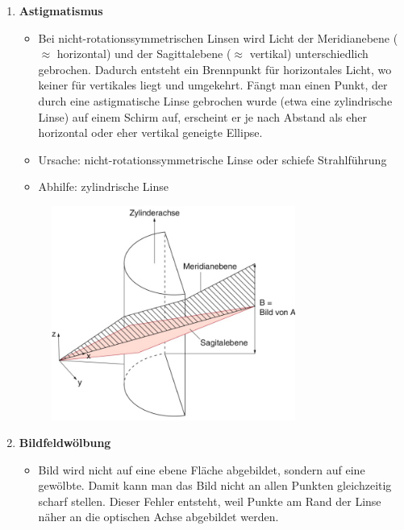 \documentclass[a4paper, 11pt, ngerman, parskip=half-]{scrartcl}
\begin{document}
\begin{enumerate}
    \item \textbf{Astigmatismus}
          \begin{itemize}
              \item Bei nicht-rotationssymmetrischen Linsen wird Licht der Meridianebene ($\approx$ horizontal) und der Sagittalebene ($\approx$ vertikal)
                    unterschiedlich gebrochen. Dadurch entsteht ein Brennpunkt für horizontales Licht, wo keiner für vertikales liegt und umgekehrt. Fängt man einen
                    Punkt, der durch eine astigmatische Linse gebrochen wurde (etwa eine zylindrische Linse) auf einem Schirm auf, erscheint er je nach Abstand als eher
                    horizontal oder eher vertikal geneigte Ellipse.
              \item Ursache: nicht-rotationssymmetrische Linse oder schiefe Strahlführung
              \item Abhilfe: zylindrische Linse
          \end{itemize}

          \begin{figure}[H]
              \centering
              \includegraphics[width=8cm]{image/18/fehler_astigmatismus.png}
          \end{figure}



    \item \textbf{Bildfeldwölbung}
          \begin{itemize}
              \item Bild wird nicht auf eine ebene Fläche abgebildet, sondern auf eine gewölbte. Damit kann man das Bild nicht an allen Punkten gleichzeitig scharf stellen.
                    Dieser Fehler entsteht, weil Punkte am Rand der Linse näher an die optischen Achse abgebildet werden.
          \end{itemize}


\end{enumerate}
\end{document}
